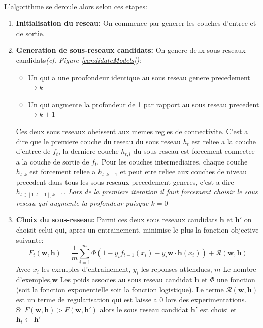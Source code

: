 \documentclass[11 pt]{article}
\begin{document}
\paragraph{}L'algorithme se deroule alors selon ces etapes:
\begin{enumerate}
	\item \textbf{Initialisation du reseau: }On commence par generer les couches d'entree et de sortie.
	\item \textbf{Generation de sous-reseaux candidats: }On genere deux sous reseaux candidats\emph{(cf. Figure \ref{candidateModels})}:
	\begin{itemize}
		\item Un qui a une proofondeur identique au sous reseau genere precedement $\rightarrow k$
		\item Un qui augmente la profondeur de 1 par rapport au sous reseau precedent $\rightarrow k+1$
	\end{itemize}
	Ces deux sous reseaux obeissent aux memes regles de connectivite. C'est a dire que le premiere couche du reseau du sous reseau $h_t$  est reliee a la couche d'entree de $f_t$, la derniere couche $h_{t,l}$ du sous reseau est forcement connectee a la couche de sortie de $f_t$. Pour les couches intermediaires, chaque couche $h_{t,k}$ est forcement reliee a $h_{t,k-1}$ et peut etre reliee aux couches de niveau precedent dans tous les sous reseaux precedement generes, c'est a dire $h_{t\in[1,t-1],k-1}$.
	\emph{Lors de la premiere iteration il faut forcement choisir le sous reseau qui augmente la profondeur puisque $k=0$}
	\item \textbf{Choix du sous-reseau: }Parmi ces deux sous reseaux candidats $\mathbf{h}$ et $\mathbf{h'}$ on choisit celui qui, apres un entrainement, minimise le plus la fonction objective suivante:
	\begin{equation*}
		F_t(\mathbf{w,h})=\frac{1}{m}\sum^m_{i=1}\Phi(1-y_if_{t-1}(x_i)-y_i\mathbf{w\cdot h}(x_i)) + \mathcal{R}(\mathbf{w,h})
	\end{equation*}
	Avec $x_i$ les exemples d'entrainement, $y_i$ les reponses attendues, $m$ Le nombre d'exemples,$\mathbf{w}$ Les poids associes au sous reseau candidat $\mathbf{h}$ et $\Phi$ une fonction (soit la fonction exponentielle soit la fonction logistique). Le terme $\mathcal{R}(\mathbf{w,h})$ est un terme de regularisation qui est laisse a $0$ lors des experimentations.\\
	Si $F(\mathbf{w,h})>F(\mathbf{w,h'})$ alors le sous reseau candidat $\mathbf{h'}$ est choisi et $\mathbf{h}_t \leftarrow \mathbf{h'}$\\

\end{enumerate}
\end{document}
